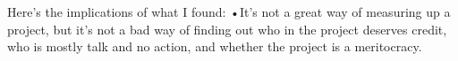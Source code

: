 \documentclass[12pt]{report}
\begin{document}
Here’s the implications of what I found:
•It’s not a great way of measuring up a project, but it’s not a bad way of finding out who in the project deserves credit, who is mostly talk and no action, and whether the project is a meritocracy.
\end{document}

